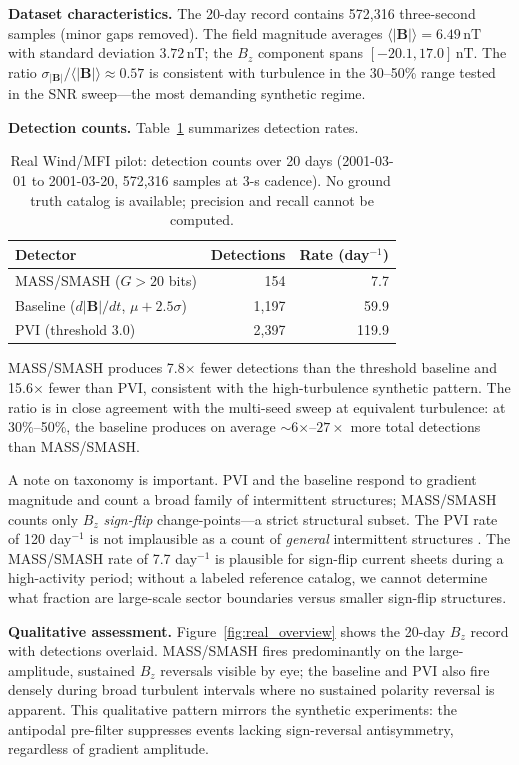 \documentclass[12pt,letterpaper]{article}
\newcommand{\nT}{\,\mathrm{nT}}
\begin{document}
\textbf{Dataset characteristics.}
The 20-day record contains 572,316 three-second samples (minor gaps removed).
The field magnitude averages $\langle|\mathbf{B}|\rangle = 6.49\nT$ with
standard deviation $3.72\nT$; the $B_z$ component spans $[-20.1, 17.0]\nT$.
The ratio $\sigma_{|\mathbf{B}|} / \langle|\mathbf{B}|\rangle \approx 0.57$
is consistent with turbulence in the 30--50\% range tested in the SNR
sweep---the most demanding synthetic regime.

\textbf{Detection counts.}
Table~\ref{tab:real_data} summarizes detection rates.

\begin{table}[htbp]
\centering
\caption{Real Wind/MFI pilot: detection counts over 20 days
(2001-03-01 to 2001-03-20, 572,316 samples at 3-s cadence).
No ground truth catalog is available; precision and recall cannot be computed.}
\label{tab:real_data}
\begin{tabular}{lrr}
\toprule
Detector & Detections & Rate (day$^{-1}$) \\
\midrule
MASS/SMASH ($G > 20$ bits) & 154  & 7.7  \\
Baseline ($d|\mathbf{B}|/dt$, $\mu + 2.5\sigma$) & 1{,}197 & 59.9 \\
PVI (threshold 3.0) & 2{,}397 & 119.9 \\
\bottomrule
\end{tabular}
\end{table}

MASS/SMASH produces 7.8$\times$ fewer detections than the threshold baseline
and 15.6$\times$ fewer than PVI, consistent with the high-turbulence synthetic
pattern.
The ratio is in close agreement with the multi-seed sweep at equivalent
turbulence: at 30\%--50\%, the baseline produces on average
$\sim$6$\times$--$27\times$ more total detections than MASS/SMASH.

A note on taxonomy is important.
PVI and the baseline respond to gradient magnitude and count a broad family of
intermittent structures; MASS/SMASH counts only $B_z$ \emph{sign-flip}
change-points---a strict structural subset.
The PVI rate of 120 day$^{-1}$ is not implausible as a count of
\emph{general} intermittent structures \citep{Greco2009}.
The MASS/SMASH rate of 7.7 day$^{-1}$ is plausible for sign-flip current
sheets during a high-activity period; without a labeled reference catalog,
we cannot determine what fraction are large-scale sector boundaries versus
smaller sign-flip structures.

\textbf{Qualitative assessment.}
Figure~\ref{fig:real_overview} shows the 20-day $B_z$ record with detections
overlaid.
MASS/SMASH fires predominantly on the large-amplitude, sustained $B_z$
reversals visible by eye; the baseline and PVI also fire densely during broad
turbulent intervals where no sustained polarity reversal is apparent.
This qualitative pattern mirrors the synthetic experiments: the antipodal
pre-filter suppresses events lacking sign-reversal antisymmetry, regardless
of gradient amplitude.
\end{document}
